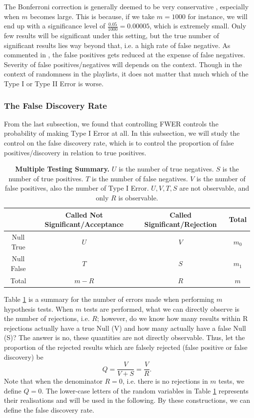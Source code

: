 \documentclass[12pt]{article}
\theoremstyle{plain}
\theoremstyle{definition}
\theoremstyle{remark}
\begin{document}
The Bonferroni correction is generally deemed to be very conservative \cite{5.4}\cite{5.1}\cite{5.3}\cite{5.5}\cite{5.6}, especially when $m$ becomes large. This is because, if we take $m=1000$ for instance, we will end up with a significance level of $\frac{0.05}{1000}=0.00005$, which is extremely small. Only few results will be significant under this setting, but the true number of significant results lies way beyond that, i.e. a high rate of false negative. As commented in \cite{5.5}, the false positives gets reduced at the expense of false negatives. Severity of false positives/negatives will depends on the context. Though in the context of randomness in the playlists, it does not matter that much which of the Type I or Type II Error is worse.

\newpage
\subsubsection{The False Discovery Rate}
From the last subsection, we found that controlling FWER controls the probability of making Type I Error at all. In this subsection, we will study the control on the false discovery rate, which is to control the proportion of false positives/discovery in relation to true positives. 

\begin{table}[h]
    \centering
    \begin{tabular}{|c|c|c|c|}
    \hline
    & Called Not Significant/Acceptance & Called Significant/Rejection & Total \\
    \hline
    Null True & $U$ & $V$ & $m_0$\\
    \hline
    Null False & $T$ & $S$ & $m_1$\\
    \hline
    Total & $m-R$ & $R$ & $m$\\
    \hline
    \end{tabular}
    \caption{\textbf{Multiple Testing Summary.} $U$ is the number of true negatives. $S$ is the number of true positives. $T$ is the number of false negatives. $V$ is the number of false positives, also the number of Type I Error. $U,V,T,S$ are not observable, and only $R$ is observable.\cite{5.3}\cite{5.7}}
    \label{table 3}
\end{table}

Table \ref{table 3} is a summary for the number of errors made when performing $m$ hypothesis tests. When $m$ tests are performed, what we can directly observe is the number of rejections, i.e. $R$; however, do we know how many results within R rejections actually have a true Null (V) and how many actually have a false Null (S)? The answer is no, these quantities are not directly observable.\cite{5.3}\cite{5.7} Thus, let the proportion of the rejected results which are falsely rejected (false positive or false discovery) be $$Q=\frac{V}{V+S}=\frac{V}{R}.$$  Note that when the denominator $R=0$, i.e. there is no rejections in $m$ tests, we define $Q=0$. The lower-case letters of the random variables in Table \ref{table 3} represents their realisations and will be used in the following. By these constructions, we can define the false discovery rate.
\end{document}
